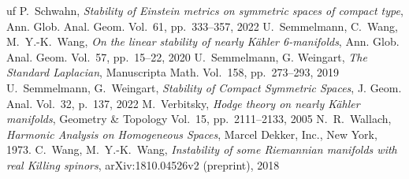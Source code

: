 \documentclass[12pt]{scrartcl}
\theoremstyle{plain}
\theoremstyle{definition}
\begin{document}
\begin{thebibliography}{uf}
 P.~Schwahn, \emph{Stability of Einstein metrics on symmetric spaces of compact type}, Ann. Glob. Anal. Geom. Vol.~61, pp.~333--357, 2022
 U.~Semmelmann, C.~Wang, M.~Y.-K.~Wang, \emph{On the linear stability of nearly Kähler 6-manifolds}, Ann. Glob. Anal. Geom. Vol.~57, pp.~15--22, 2020
 U.~Semmelmann, G. Weingart, \emph{The Standard Laplacian}, Manuscripta Math. Vol.~158, pp.~273--293, 2019
 U.~Semmelmann, G.~Weingart, \emph{Stability of Compact Symmetric Spaces}, J. Geom. Anal. Vol.~32, p.~137, 2022
 M.~Verbitsky, \emph{Hodge theory on nearly Kähler manifolds}, Geometry \& Topology Vol.~15, pp.~2111--2133, 2005
 N.~R.~Wallach, \emph{Harmonic Analysis on Homogeneous Spaces}, Marcel Dekker, Inc., New York, 1973.
 C.~Wang, M.~Y.-K.~Wang, \emph{Instability of some Riemannian manifolds with real Killing spinors}, arXiv:1810.04526v2 (preprint), 2018
\end{thebibliography}
\end{document}
